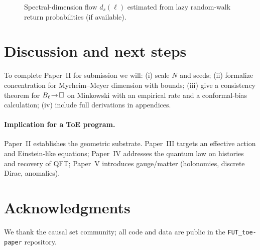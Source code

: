 \begin{figure}[t]
  \centering
  \caption{Spectral-dimension flow $d_s(\ell)$ estimated from lazy random-walk return probabilities (if available).}
\end{figure}

\section{Discussion and next steps}
To complete Paper~II for submission we will: (i) scale $N$ and seeds; (ii) formalize concentration for Myrheim--Meyer dimension with bounds;
(iii) give a consistency theorem for $B_\ell\!\to\!\Box$ on Minkowski with an empirical rate and a conformal-bias calculation; (iv) include full derivations in appendices.

\paragraph{Implication for a ToE program.}
Paper~II establishes the geometric substrate. Paper~III targets an effective action and Einstein-like equations; Paper~IV addresses the quantum law on histories and recovery of QFT; Paper~V introduces gauge/matter (holonomies, discrete Dirac, anomalies).

\section*{Acknowledgments}
We thank the causal set community; all code and data are public in the \texttt{FUT\_toe-paper} repository.




\appendix

